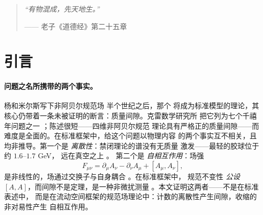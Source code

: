 \documentclass[aps,prd,preprint,superscriptaddress,amsmath,amssymb]{revtex4-2}
\begin{document}
\maketitle

\begin{quote}
\itshape
``有物混成，先天地生。''
\par
—— 老子《道德经》第二十五章
\end{quote}

\section{引言}
\label{sec:intro}

\paragraph{问题之名所携带的两个事实。}
杨和米尔斯写下非阿贝尔规范场 \cite{yang1954conservation} 半个世纪之后，那个
将成为标准模型的理论，其核心仍带着一条未被证明的断言：质量间隙。克雷数学研究所
把它列为七个千禧年问题之一 \cite{jaffe2000yang}；陈述很短——四维非阿贝尔规范
理论具有严格正的质量间隙——而难度是全面的。在标准框架中，给这个问题以物理内容
的两个事实互不相关，且均非推导。第一个是 \emph{离散性}：禁闭理论的谱没有无质量
激发——最轻的胶球位于约 $1.6$--$1.7$ GeV，
远在真空之上 \cite{morningstar1999glueball,chen2006glueball}。
第二个是 \emph{自相互作用}：场强
\begin{equation}
F_{\mu\nu}=\partial_\mu A_\nu-\partial_\nu A_\mu+[A_\mu,A_\nu],
\label{eq:ymfield}
\end{equation}
是非线性的，场通过交换子与自身耦合 \cite{yang1954conservation}。在标准框架中，
规范不变性 \emph{公设} $[A,A]$，而间隙不是定理，是一种非微扰测量
\cite{jaffe2000yang,weinberg1995quantum}。本文证明这两者——不是在标准表述中，
而是在流动空间框架的规范场理论中：计数的离散性产生间隙，收缩的非对易性产生
自相互作用。
\end{document}
